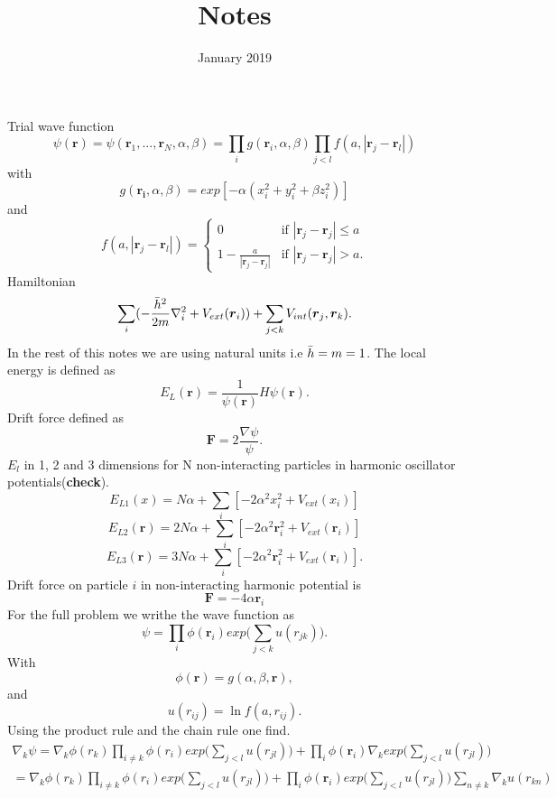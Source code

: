 \documentclass{article}
\title{Notes}
\author{ }
\date{January 2019}
\begin{document}
\maketitle

\section{}
Trial wave function \newline
$$\psi(\boldsymbol{r}) =  \psi(\boldsymbol{r}_1,...,\boldsymbol{r}_N, \alpha,\beta) = \prod_{i}g(\boldsymbol{r}_i,\alpha,\beta) \prod_{j<l}f(a,|\boldsymbol{r}_j -\boldsymbol{r}_l|)$$ \newline
with $$g(\boldsymbol{r_i},\alpha,\beta) = exp[-\alpha(x_i^2 + y_i^2 + \beta z_i^2)]$$ and \[ f(a,|\boldsymbol{r}_j -\boldsymbol{r}_l|) = \begin{cases}
    0 & \text{if } |\boldsymbol{r}_j - \boldsymbol{r}_j| \leq  a \\
    1 - \frac{a}{|\boldsymbol{r}_j - \boldsymbol{r}_j|} & \text{if } |\boldsymbol{r}_j - \boldsymbol{r}_j| >  a.
\end{cases}
\]
Hamiltonian 
$$\sum_i(-\frac{\Bar{h}^2}{2m}\nabla_i^2 + V_{ext}(\boldsymbol{r}_i)) + \sum_{j<k}V_{int}(\boldsymbol{r}_j,\boldsymbol{r}_k).$$
In the rest of this notes we are using natural units i.e $\Bar{h}=m=1$.
The local energy is defined as $$E_L(\boldsymbol{r}) = \frac{1}{\psi(\boldsymbol{r})} H \psi(\boldsymbol{r}).$$
Drift force defined as
$$\boldsymbol{F} = 2 \frac{\nabla \psi}{\psi}.$$
$E_l$ in 1, 2 and 3 dimensions for N non-interacting particles in harmonic oscillator potentials(\textbf{check}). 
$$E_{L1}(x) = N \alpha + \sum_i[-2\alpha^2 x_i^2 + V_{ext}(x_i)] $$
$$E_{L2}(\boldsymbol{r}) = 2N \alpha +\sum_i[ -2\alpha^2 \boldsymbol{r}_i^2 + V_{ext}(\boldsymbol{r}_i)]$$
$$E_{L3}(\boldsymbol{r}) = 3N \alpha + \sum_i[ -2\alpha^2 \boldsymbol{r}_i^2 + V_{ext}(\boldsymbol{r}_i)].$$
Drift force on particle $i$ in non-interacting harmonic potential is 
$$\boldsymbol{F} = -4\alpha \boldsymbol{r}_i$$
For the full problem we writhe the wave function as
$$\psi = \prod_i \phi(\boldsymbol{r}_i) exp\big(\sum_{j<k}u(r_{jk})\big). $$
With $$\phi(\boldsymbol{r}) = g(\alpha,\beta,\boldsymbol{r}),$$
and $$u(r_{ij}) = \ln{f(a,r_{ij})}.$$
Using the product rule and the chain rule one find. \newline
\begin{equation*}
\begin{split}
    \nabla_k \psi = \nabla_k \phi(r_k) \prod_{i \neq k} \phi(r_i)exp\big(\sum_{j<l}u(r_{jl})\big)  + \prod_i \phi(\boldsymbol{r}_i) \nabla_k exp\big(\sum_{j<l}u(r_{jl})\big) 
 \\= \nabla_k \phi(r_k) \prod_{i \neq k} \phi(r_i)exp\big(\sum_{j<l}u(r_{jl})\big) + \prod_i \phi(\boldsymbol{r}_i) exp\big(\sum_{j<l}u(r_{jl})\big) \sum_{n\neq k}\nabla_k u(r_{kn})
\end{split}
\end{equation*}
\end{document}
